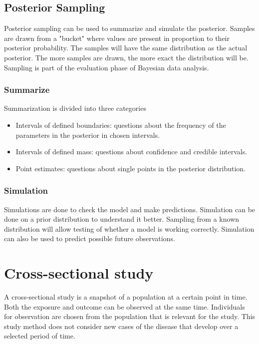 \subsection{Posterior Sampling}\label{PosteriorSampling}

Posterior sampling can be used to summarize and simulate the posterior. Samples are drawn from a "bucket" where values are present in proportion to their posterior probability. The samples will have the same distribution as the actual posterior. The more samples are drawn, the more exact the distribution will be. Sampling is part of the evaluation phase of Bayesian data analysis.
\cite{Mcelreath2015StatisticalRA}

\subsubsection*{Summarize}

Summarization is divided into three categories

\begin{itemize}
    \item Intervals of defined boundaries: questions about the frequency of the parameters in the posterior in chosen intervals.
    \item Intervals of defined mass: questions about confidence and credible intervals. 
    \item Point estimates: questions about single points in the posterior distribution.
\end{itemize}

\subsubsection*{Simulation}

Simulations are done to check the model and make predictions. Simulation can be done on a prior distribution to understand it better. Sampling from a known distribution will allow testing of whether a model is working correctly. Simulation can also be used to predict possible future observations. \cite{Mcelreath2015StatisticalRA}

\section{Cross-sectional study}\label{CrossSectionalStudy}

A cross-sectional study is a snapshot of a population at a certain point in time. Both the exposure and outcome can be observed at the same time. Individuals for observation are chosen from the population that is relevant for the study. This study method does not consider new cases of the disease that develop over a selected period of time. 

